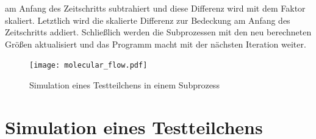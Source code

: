 \documentclass{listhesis}
\begin{document}
am Anfang des Zeitschritts subtrahiert und diese Differenz wird mit dem Faktor skaliert. Letztlich wird die skalierte Differenz zur Bedeckung am Anfang des Zeitschritts addiert. Schließlich werden die Subprozessen mit den neu berechneten Größen aktualisiert und das Programm macht mit der nächsten Iteration weiter.

\begin{figure}[t]
\centering
\texttt{[image: molecular\_flow.pdf]}
\caption{Simulation eines Testteilchens in einem Subprozess}
\label{fig:simulation}
\end{figure}

\section{Simulation eines Testteilchens} \label{section:molflow}
\end{document}
